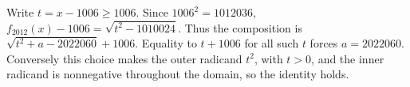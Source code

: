 Write $t=x-1006\ge1006$. Since $1006^2=1012036$, $f_{2012}(x)-1006=\sqrt{t^2-1010024}$. Thus the composition is $\sqrt{t^2+a-2022060}+1006$. Equality to $t+1006$ for all such $t$ forces $\boxed{a=2022060}$. Conversely this choice makes the outer radicand $t^2$, with $t>0$, and the inner radicand is nonnegative throughout the domain, so the identity holds.
